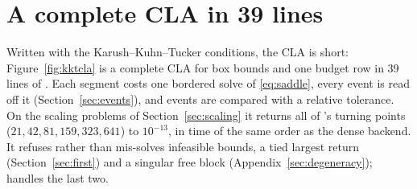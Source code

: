 \section{A complete CLA in 39 lines}
\label{sec:listing}

Written with the Karush--Kuhn--Tucker conditions, the CLA is short:
Figure~\ref{fig:kktcla} is a complete CLA for box bounds and one budget row in 39 lines
of . Each segment costs one bordered
solve of \eqref{eq:saddle}, every event is read off it (Section~\ref{sec:events}), and
events are compared with a relative tolerance. On the scaling problems of
Section~\ref{sec:scaling} it returns all of 's turning points
($21, 42, 81, 159, 323, 641$) to $10^{-13}$, in time of the same order as the dense
backend. It refuses rather than mis-solves infeasible bounds, a tied largest return
(Section~\ref{sec:first}) and a singular free block (Appendix~\ref{sec:degeneracy});
 handles the last two.

